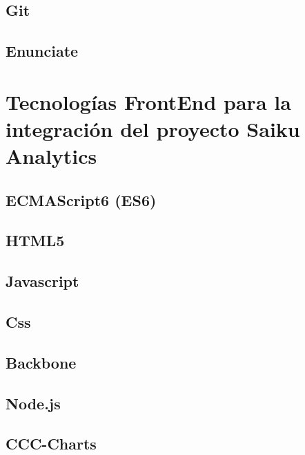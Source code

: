 	\subsection{Git}
			\lipsum[1-2]
	\subsection{Enunciate}
			\lipsum[1-2]
\section{Tecnolog\'{i}as FrontEnd para la integraci\'{o}n
		 del proyecto Saiku Analytics}
		\lipsum[1-2]
	\subsection{ECMAScript6 (ES6)}
			\lipsum[1-2]
	\subsection{HTML5}
			\lipsum[1-2]
	\subsection{Javascript}
			\lipsum[1-2]
	\subsection{Css}
			\lipsum[1-2]
	\subsection{Backbone}
			\lipsum[1-2]
	\subsection{Node.js}
			\lipsum[1-2]
	\subsection{CCC-Charts}
			\lipsum[1-2]

		
		
		
		
